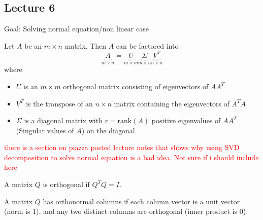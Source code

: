 \subsection{Lecture 6}
Goal: Solving normal equation/non linear case
\begin{definition}
  Let $A$ be an $m \times n$ matrix. Then $A$ can be factored into
  $$\underbrace{A}_{m \times n} = \underbrace{U}_{m \times m}\underbrace{\Sigma}_{m \times n}\underbrace{V^T}_{n \times n}$$
  where
  \begin{itemize}
    \item $U$ is an $m \times m$ orthogonal matrix consisting of eigenvectors of $AA^T$
    \item $V^T$ is the transpose of an $n \times n$ matrix containing the eigenvectors of $A^TA$
    \item $\Sigma$ is a diagonal matrix with $r = \text{rank}(A)$ positive eigenvalues of $AA^T$ (Singular values of $A$) on the diagonal.
  \end{itemize}
\end{definition}
\textcolor{red}{there is a section on piazza posted lecture notes that shows why using SVD decomposition to solve normal equation is a bad idea. Not sure if i should include here}
\begin{definition}
  A matrix $Q$ is orthogonal if $Q^TQ = I$.
\end{definition}
\begin{definition}
  A matrix $Q$ has orthonormal columns if each column vector is a unit vector (norm is 1), and any two distinct columns are orthogonal (inner product is 0).
\end{definition}
